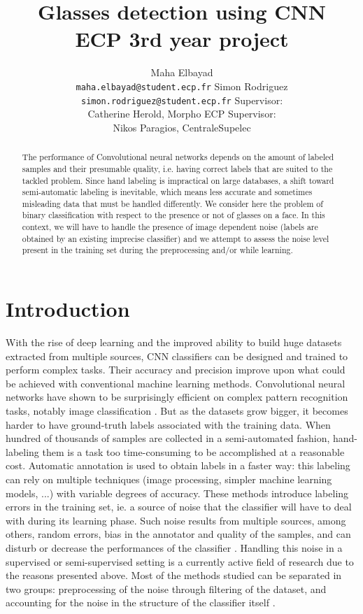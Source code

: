 \documentclass[a4paper]{article}
\author{Maha Elbayad \\ \texttt{maha.elbayad@student.ecp.fr}  \And Simon Rodriguez \\
    \texttt{simon.rodriguez@student.ecp.fr} \AND Supervisor: \\Catherine Herold, Morpho \And ECP Supervisor: \\Nikos Paragios, CentraleSupelec}
\title{Glasses detection using CNN\\ECP 3rd year project}
\date{}
\begin{document}
\maketitle
\begin{abstract}
    The performance of Convolutional neural networks depends on the amount of labeled samples and their presumable quality, i.e. having correct labels that are suited to the tackled problem. Since hand labeling is impractical on large databases, a shift toward semi-automatic labeling is inevitable, which means less accurate and sometimes misleading data that must be handled differently. We consider here the problem of binary classification with respect to the presence or not of glasses on a face. In this context, we will have to handle the presence of image dependent noise (labels are obtained by an existing imprecise classifier) and we attempt to assess the noise level present in the training set during the preprocessing and/or while learning. 
\end{abstract}

\section{Introduction}
    With the rise of deep learning and the improved ability to build huge datasets extracted from multiple sources, CNN classifiers can be designed and trained to perform complex tasks. Their accuracy and precision improve upon what could be achieved with conventional machine learning methods. Convolutional neural networks have shown to be surprisingly efficient on complex pattern recognition tasks, notably image classification \cite{krizhevsky2012imagenet}. But as the datasets grow bigger, it becomes harder to have ground-truth labels associated with the training data. When hundred of thousands of samples are collected in a semi-automated fashion, hand-labeling them is a task too time-consuming to be accomplished at a reasonable cost. Automatic annotation is used to obtain labels in a faster way: this labeling can rely on multiple techniques (image processing, simpler machine learning models, ...) with variable degrees of accuracy. These methods introduce labeling errors in the training set, ie. a source of noise that the classifier will have to deal with during its learning phase. Such noise results from multiple sources, among others, random errors, bias in the annotator and quality of the samples\cite{xiao2015learning}, and can disturb or decrease the performances of the classifier \cite{flatowrobustness}.
    Handling this noise in a supervised or semi-supervised setting is a currently active field of research due to the reasons presented above. Most of the methods studied can be separated in two groups: preprocessing of the noise through filtering of the dataset, and accounting for the noise in the structure of the classifier itself \cite{frenay2014comprehensive}.
\end{document}
